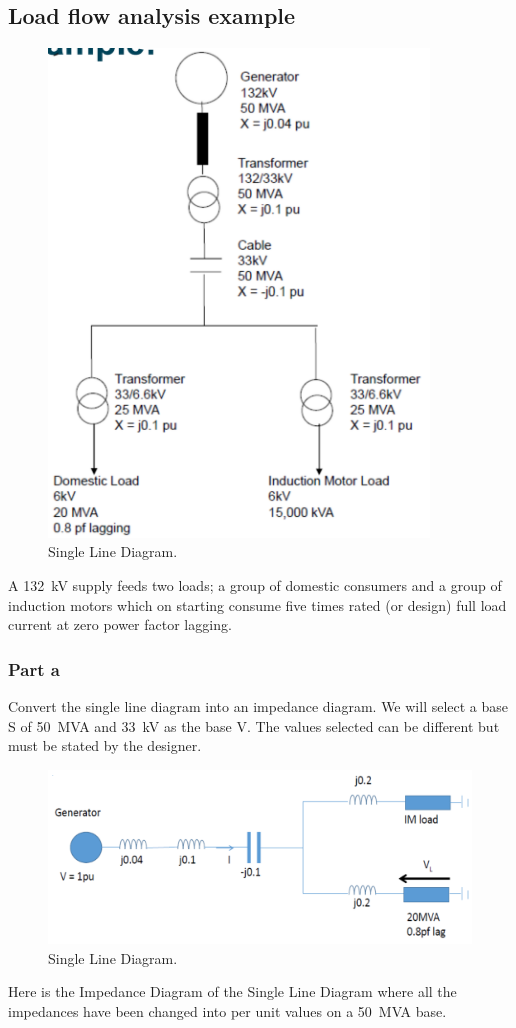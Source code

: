 \subsection{Load flow analysis example}
\begin{figure}[H]
	\centering
	\includegraphics[width = 0.9\textwidth]{./img/figure15.png}
	\caption{Single Line Diagram.}
\end{figure}
A \SI{132}{kV} supply feeds two loads; a group of domestic consumers and a group of induction motors which on starting consume five times rated (or design) full load current at zero power factor lagging.
\subsubsection{Part a}
Convert the single line diagram into an impedance diagram. We will select a base S of \SI{50}{MVA} and \SI{33}{kV} as the base V. The values selected can be different but must be stated by the designer.
\begin{figure}[H]
	\centering
	\includegraphics[width =  \textwidth]{./img/figure16.png}
	\caption{Single Line Diagram.}
\end{figure}
Here is the Impedance Diagram of the Single Line Diagram where all the impedances have been changed into per unit values on a \SI{50}{MVA} base.
